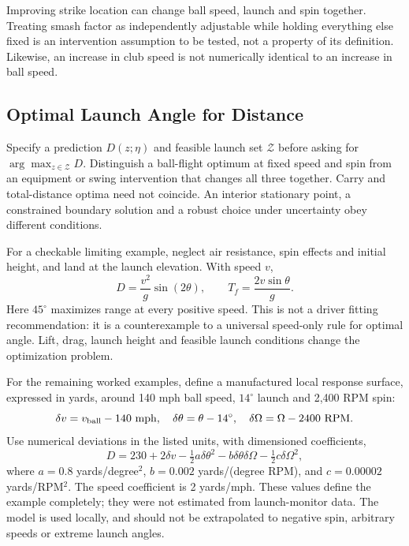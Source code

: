 Improving strike location can change ball speed, launch and spin together.
Treating smash factor as independently adjustable while holding everything
else fixed is an intervention assumption to be tested, not a property of its
definition. Likewise, an increase in club speed is not numerically identical
to an increase in ball speed.

\subsection{Optimal Launch Angle for Distance}

Specify a prediction $D(z;\eta)$ and feasible launch set $\mathcal Z$ before
asking for $\arg\max_{z\in\mathcal Z}D$. Distinguish a ball-flight optimum
at fixed speed and spin from an equipment or swing intervention that changes
all three together. Carry and total-distance optima need not coincide. An
interior stationary point, a constrained boundary solution and a robust
choice under uncertainty obey different conditions.

For a checkable limiting example, neglect air resistance, spin effects and
initial height, and land at the launch elevation. With speed $v$,
\[
D=\frac{v^2}{g}\sin(2\theta),\qquad
T_f=\frac{2v\sin\theta}{g}.
\]
Here $45^\circ$ maximizes range at every positive speed. This is not a driver
fitting recommendation: it is a counterexample to a universal speed-only
rule for optimal angle. Lift, drag, launch height and feasible launch
conditions change the optimization problem.

For the remaining worked examples, define a manufactured local response
surface, expressed in yards, around 140 mph ball speed, $14^\circ$ launch
and 2,400 RPM spin:
\[
\delta v=v_{\rm ball}-140\ {\rm mph},\quad
\delta\theta=\theta-14^\circ,\quad
\delta\Omega=\Omega-2400\ {\rm RPM}.
\]
Use numerical deviations in the listed units, with dimensioned coefficients,
\begin{equation}
D=230+2\delta v-\tfrac12 a\delta\theta^2
-b\delta\theta\delta\Omega-\tfrac12 c\delta\Omega^2,
\label{eq:spin_distance}
\end{equation}
where $a=0.8$ yards/degree$^2$, $b=0.002$ yards/(degree RPM), and
$c=0.00002$ yards/RPM$^2$. The speed coefficient is 2 yards/mph.
These values define the example completely; they were not estimated from
launch-monitor data. The model is used locally, and should not be extrapolated
to negative spin, arbitrary speeds or extreme launch angles.

